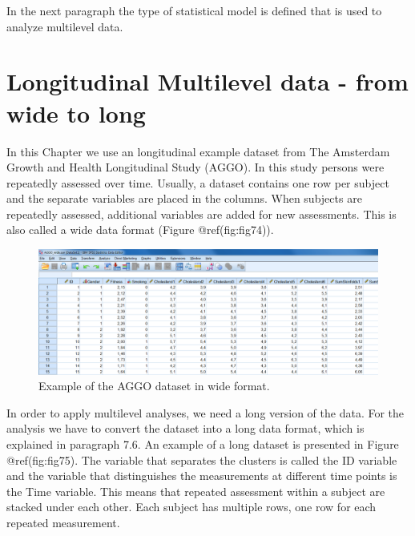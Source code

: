 \documentclass[
]{book}
\begin{document}
In the next paragraph the type of statistical model is defined that is
used to analyze multilevel data.

\hypertarget{longitudinal-multilevel-data---from-wide-to-long}{%
\section{Longitudinal Multilevel data - from wide to
long}\label{longitudinal-multilevel-data---from-wide-to-long}}

In this Chapter we use an longitudinal example dataset from The
Amsterdam Growth and Health Longitudinal Study (AGGO). In this study
persons were repeatedly assessed over time. Usually, a dataset contains
one row per subject and the separate variables are placed in the
columns. When subjects are repeatedly assessed, additional variables are
added for new assessments. This is also called a wide data format
(Figure @ref(fig:fig74)).

\begin{figure}

{\centering \includegraphics[width=0.9\linewidth]{images/fig7.2} 

}

\caption{Example of the AGGO dataset in wide format.}\label{fig:fig74}
\end{figure}

In order to apply multilevel analyses, we need a long version of the
data. For the analysis we have to convert the dataset into a long data
format, which is explained in paragraph 7.6. An example of a long
dataset is presented in Figure @ref(fig:fig75). The variable that
separates the clusters is called the ID variable and the variable that
distinguishes the measurements at different time points is the Time
variable. This means that repeated assessment within a subject are
stacked under each other. Each subject has multiple rows, one row for
each repeated measurement.
\end{document}

